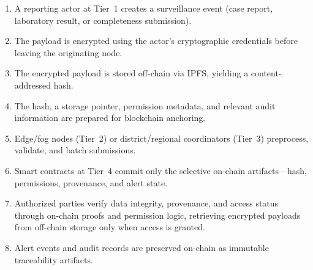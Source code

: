%
%

\begin{enumerate}
\item A reporting actor at Tier~1 creates a surveillance event (case report, laboratory result, or completeness submission).
\item The payload is encrypted using the actor's cryptographic credentials before leaving the originating node.
\item The encrypted payload is stored off-chain via IPFS, yielding a content-addressed hash.
\item The hash, a storage pointer, permission metadata, and relevant audit information are prepared for blockchain anchoring.
\item Edge/fog nodes (Tier~2) or district/regional coordinators (Tier~3) preprocess, validate, and batch submissions.
\item Smart contracts at Tier~4 commit only the selective on-chain artifacts---hash, permissions, provenance, and alert state.
\item Authorized parties verify data integrity, provenance, and access status through on-chain proofs and permission logic, retrieving encrypted payloads from off-chain storage only when access is granted.
\item Alert events and audit records are preserved on-chain as immutable traceability artifacts.
\end{enumerate}

